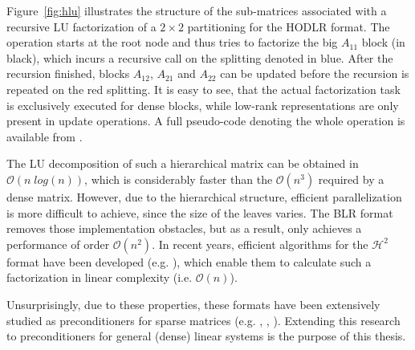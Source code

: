 Figure~\hyperref[fig:hlu]{\ref{fig:hlu}} illustrates the structure of the sub-matrices associated with a recursive LU factorization of a $2 \times 2$ partitioning for the HODLR format. The operation starts at the root node and thus tries to factorize the big $A_{11}$  block (in black), which incurs a recursive call on the splitting denoted in blue. After the recursion finished, blocks $A_{12}$, $A_{21}$ and $A_{22}$ can be updated before the recursion is repeated on the red splitting. It is easy to see, that the actual factorization task is exclusively executed for dense blocks, while low-rank representations are only present in update operations. A full pseudo-code denoting the whole operation is available from \cite{hackbusch_hierarchical_2015}.

The LU decomposition of such a hierarchical matrix can be obtained in $\mathcal{O}(n\;log(n))$, which is considerably faster than the $\mathcal{O}(n^3)$ required by a dense matrix. However, due to the hierarchical structure, efficient parallelization is more difficult to achieve, since the size of the leaves varies. The BLR format removes those implementation obstacles, but as a result, only achieves a performance of order $\mathcal{O}(n^2)$. In recent years, efficient algorithms for the $\mathcal{H}^2$ format have been developed (e.g. \cite{ma_accuracy_2018}), which enable them to calculate such a factorization in linear complexity (i.e. $\mathcal{O}(n)$). 

Unsurprisingly, due to these properties, these formats have been extensively studied as preconditioners for sparse matrices (e.g. \cite{bebendorf_hierarchical_2008}, \cite{xia_fast_2010}, \cite{gatto_preconditioner_2015}). Extending this research to preconditioners for general (dense) linear systems is the purpose of this thesis.